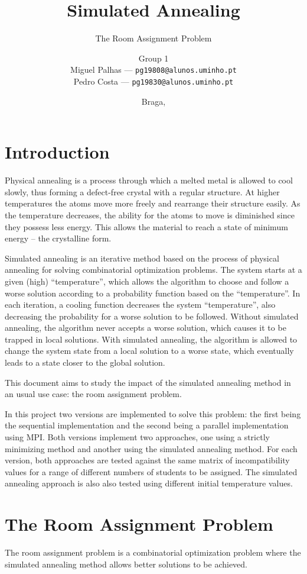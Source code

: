 \documentclass[abstract=on,9pt,twocolumn]{scrartcl}
\title{Simulated Annealing}
\subtitle{The Room Assignment Problem}
\author{{\larger Group 1}\\Miguel Palhas \hfill--- \texttt{\smaller pg19808@alunos.uminho.pt}\\Pedro Costa \hfill--- \texttt{\smaller pg19830@alunos.uminho.pt}\\}
\date{Braga, \docdate}
\begin{document}
\maketitle

\section{Introduction}
Physical annealing is a process through which a melted metal is allowed to cool slowly, thus forming a defect-free crystal with a regular structure. At higher temperatures the atoms move more freely and rearrange their structure easily. As the temperature decreases, the ability for the atoms to move is diminished since they possess less energy. This allows the material to reach a state of minimum energy -- the crystalline form.

Simulated annealing is an iterative method based on the process of physical annealing for solving combinatorial optimization problems. The system starts at a given (high) ``temperature'', which allows the algorithm to choose and follow a worse solution according to a probability function based on the ``temperature''. In each iteration, a cooling function decreases the system ``temperature'', also decreasing the probability for a worse solution to be followed. Without simulated annealing, the algorithm never accepts a worse solution, which causes it to be trapped in local solutions. With simulated annealing, the algorithm is allowed to change the system state from a local solution to a worse state, which eventually leads to a state closer to the global solution.

This document aims to study the impact of the simulated annealing method in an usual use case: the room assignment problem.

In this project two versions are implemented to solve this problem: the first being the sequential implementation and the second being a parallel implementation using MPI. Both versions implement two approaches, one using a strictly minimizing method and another using the simulated annealing method. For each version, both approaches are tested against the same matrix of incompatibility values for a range of different numbers of students to be assigned. The simulated annealing approach is also also tested using different initial temperature values.




\section{The Room Assignment Problem}
The room assignment problem is a combinatorial optimization problem where the simulated annealing method allows better solutions to be achieved.
\end{document}
